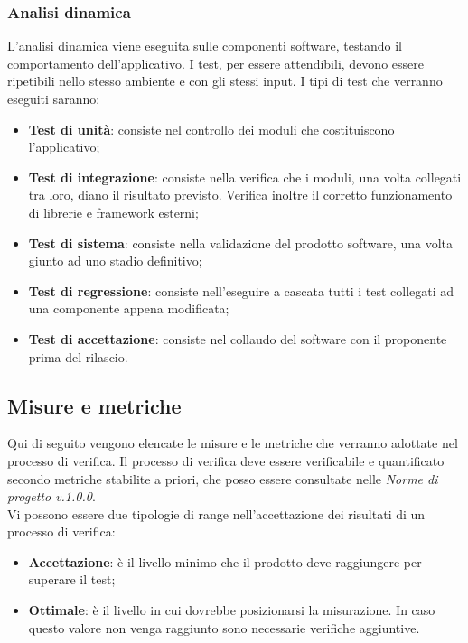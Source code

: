 \documentclass[12pt,a4paper,titlepage]{article}
\begin{document}
		\subsubsection{Analisi dinamica}
		L'analisi dinamica viene eseguita sulle componenti software, testando il comportamento dell'applicativo. I test, per essere attendibili, devono essere ripetibili nello stesso ambiente e con gli stessi input.
		I tipi di test che verranno eseguiti saranno:
		\begin{itemize}
			\item \textbf{Test di unità}: consiste nel controllo dei moduli che costituiscono l'applicativo;
			\item \textbf{Test di integrazione}: consiste nella verifica che i moduli, una volta collegati tra loro, diano il risultato previsto. Verifica inoltre il corretto funzionamento di librerie e framework esterni;
			\item \textbf{Test di sistema}: consiste nella validazione del prodotto software, una volta giunto ad uno stadio definitivo;
			\item \textbf{Test di regressione}: consiste nell'eseguire a cascata tutti i test collegati ad una componente appena modificata;
			\item \textbf{Test di accettazione}: consiste nel collaudo del software con il proponente prima del rilascio.
		\end{itemize}
	
	\subsection{Misure e metriche}
	\label{MisureMetriche}
	Qui di seguito vengono elencate le misure e le metriche che verranno adottate nel processo di verifica. Il processo di verifica deve essere verificabile e quantificato secondo metriche stabilite a priori, che posso essere consultate nelle \textit{Norme di progetto v.1.0.0}.\\
	Vi possono essere due tipologie di range nell'accettazione dei risultati di un processo di verifica:
	\begin{itemize}
		\item \textbf{Accettazione}: è il livello minimo che il prodotto deve raggiungere per superare il test;
		\item \textbf{Ottimale}: è il livello in cui dovrebbe posizionarsi la misurazione. In caso questo valore non venga raggiunto sono necessarie verifiche aggiuntive.
	\end{itemize}
\end{document}
